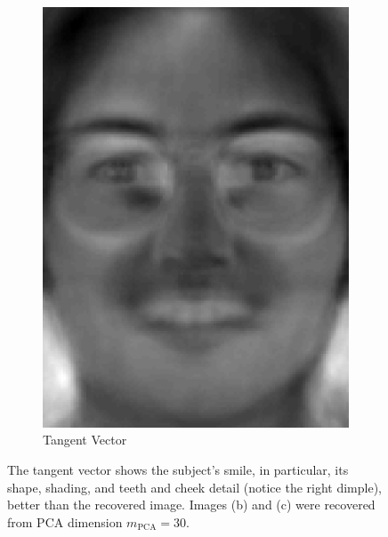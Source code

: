 \documentclass[review]{elsarticle}
\begin{document}
\begin{figure}[H]
\begin{subfigure}[b]{0.18\textwidth}
	\includegraphics[width=\linewidth]{Fig_6c}
		\caption{Tangent Vector}
	\label{fig:tv_ex_4}
	\hfill
\end{subfigure}
\hspace*{\fill}
\caption{The tangent vector shows the subject's smile, in particular, its shape, shading, and teeth and cheek detail (notice the right dimple), better than the recovered image. Images (b) and (c) were recovered from PCA dimension $m_\mathrm{PCA}=30$. }
\label{fig:AR_PCA_4}
\end{figure}
\end{document}
